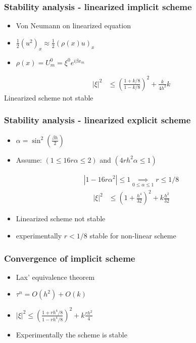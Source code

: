 \documentclass[screen]{beamer}
\begin{document}
\begin{frame}

\frametitle{Stability analysis - linearized implicit scheme}
\begin{itemize}
\item Von Neumann on linearized equation \\
\item $\frac{1}{2}(u^2)_x \approx \frac{1}{2}(\rho(x)u)_x$ \\
\item $\rho(x) = U^0_m = \xi^0 e^{i\beta x_m}$ 
\end{itemize}


\begin{align*}
|\xi |^2 &\le \left(\frac{1+k/8}{1-k/8}\right)^2 + \frac{k}{4h^2}k
\end{align*}
Linearized scheme not stable

\end{frame}


\begin{frame}
\frametitle{Stability analysis - linearized explicit scheme}

\begin{itemize}
\item $\alpha = \sin^2(\frac{\beta h}{2})$
\item Assume: $(1 \le 16r\alpha \le 2)$ and $(4rh^2\alpha \le 1)$
\end{itemize}

\begin{align*}
 \left| 1-16r\alpha^2\right| \le 1 \underset{0\le \alpha\le 1}{\implies}  r \le 1/8 
\end{align*} 
\begin{align*}
|\xi |^2 &\le \left(1 + \frac{h^4}{32}\right)^2 + k\frac{h^2}{32} 
\end{align*}

\begin{itemize}
\item Linearized scheme not stable
\item experimentally $r < 1/8$ stable for non-linear scheme
\end{itemize}
\end{frame}


\begin{frame}
\frametitle{Convergence of implicit scheme}

\begin{itemize}
\item Lax' equivalence theorem
\item $\tau ^n = O(h^2) + O(k) $
\item $|\xi |^2 \le \left(\frac{1+rh^4/8}{1-rh^4/8}\right)^2 + k\frac{rh^2}{4}$
\item Experimentally the scheme is stable
\end{itemize}

\end{frame}
\end{document}
